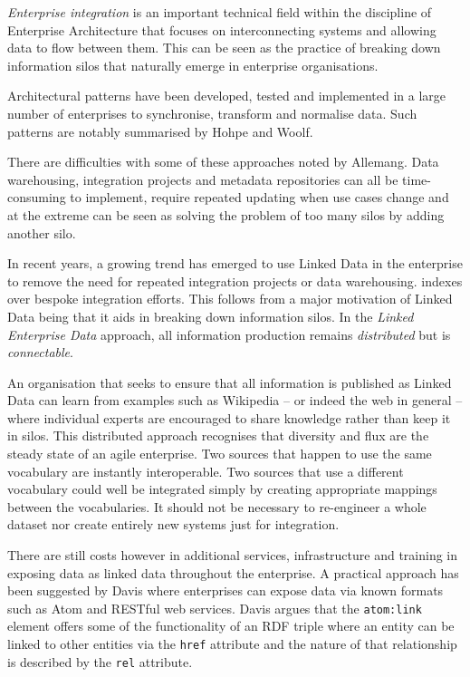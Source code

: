 \emph{Enterprise integration} is an important technical field within the
discipline of Enterprise Architecture that focuses on interconnecting
systems and allowing data to flow between them. This can be seen as
the practice of breaking down information silos that naturally emerge
in enterprise organisations.\cite{allemang2010semantic}

Architectural patterns have been developed, tested and
implemented in a large number of enterprises to synchronise,
transform and normalise data. Such patterns are notably
summarised by Hohpe and Woolf.\cite{hohpe2004enterprise}

There are difficulties with some of these approaches noted by
Allemang\cite{allemang2010semantic}. Data warehousing,
integration projects and metadata repositories can all
be time-consuming to implement, require repeated updating when
use cases change and at the extreme can be seen as solving the
problem of too many silos by adding another silo.

In recent years, a growing trend has emerged to use
Linked Data in the enterprise to remove the need
for repeated integration projects or data warehousing.
indexes over bespoke integration efforts. This follows from
a major motivation of Linked Data being that it aids in breaking
down information silos.\cite{bizer2009linked} In the
\emph{Linked Enterprise Data} approach, all information
production remains \emph{distributed} but is
\emph{connectable}.\cite{allemang2010semantic}

An organisation that seeks to ensure that all information is
published as Linked Data can learn from examples such as Wikipedia
-- or indeed the web in general -- where individual experts are
encouraged to share knowledge rather than keep it in silos. This
distributed approach recognises that diversity and flux are the
steady state of an agile enterprise. Two sources that happen
to use the same vocabulary are instantly interoperable. Two
sources that use a different vocabulary could well be integrated
simply by creating appropriate mappings between the vocabularies.
It should not be necessary to re-engineer a whole dataset nor
create entirely new systems just for integration.

There are still costs however in additional services, infrastructure
and training in exposing data as linked data throughout the
enterprise.\cite{hyland2010preparing} A practical approach
has been suggested by Davis\cite{davis2011achieving} where enterprises
can expose data via known formats such as Atom\cite{nottingham2005atom}
and RESTful web services. Davis argues that the \texttt{atom:link}
element offers some of the functionality of an RDF triple where
an entity can be linked to other entities via the \texttt{href}
attribute and the nature of that relationship is described by
the \texttt{rel} attribute.

